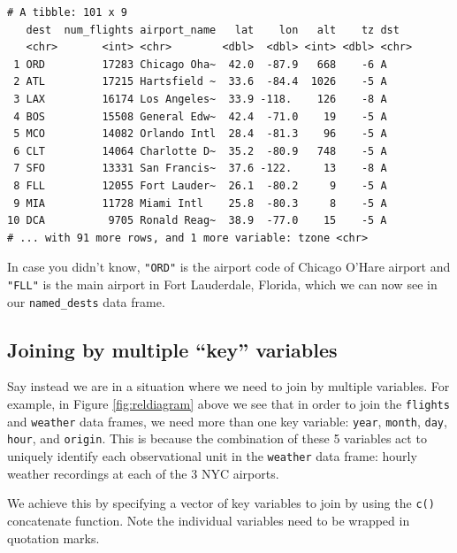 \documentclass[12pt,]{krantz}
\makeatletter
\newenvironment{Shaded}{\begin{snugshade}}{\end{snugshade}}
\newcommand{\KeywordTok}[1]{\textcolor[rgb]{0.27,0.27,0.27}{\textbf{#1}}}
\newcommand{\DataTypeTok}[1]{\textcolor[rgb]{0.27,0.27,0.27}{#1}}
\newcommand{\StringTok}[1]{\textcolor[rgb]{0.5,0.5,0.5}{#1}}
\newcommand{\OperatorTok}[1]{\textcolor[rgb]{0.43,0.43,0.43}{\textbf{#1}}}
\newcommand{\NormalTok}[1]{#1}
\newenvironment{kframe}{%
\medskip{}
\setlength{\fboxsep}{.8em}
 \def\at@end@of@kframe{}%
 \ifinner\ifhmode%
  \def\at@end@of@kframe{\end{minipage}}%
  \begin{minipage}{\columnwidth}%
 \fi\fi%
 \def\FrameCommand##1{\hskip\@totalleftmargin \hskip-\fboxsep
 \colorbox{shadecolor}{##1}\hskip-\fboxsep
     \hskip-\linewidth \hskip-\@totalleftmargin \hskip\columnwidth}%
 \MakeFramed {\advance\hsize-\width
   \@totalleftmargin\z@ \linewidth\hsize
   \@setminipage}}%
 {\par\unskip\endMakeFramed%
 \at@end@of@kframe}
\renewenvironment{Shaded}{\begin{kframe}}{\end{kframe}}
\makeatother
\begin{document}
\begin{verbatim}
# A tibble: 101 x 9
   dest  num_flights airport_name   lat    lon   alt    tz dst  
   <chr>       <int> <chr>        <dbl>  <dbl> <int> <dbl> <chr>
 1 ORD         17283 Chicago Oha~  42.0  -87.9   668    -6 A    
 2 ATL         17215 Hartsfield ~  33.6  -84.4  1026    -5 A    
 3 LAX         16174 Los Angeles~  33.9 -118.    126    -8 A    
 4 BOS         15508 General Edw~  42.4  -71.0    19    -5 A    
 5 MCO         14082 Orlando Intl  28.4  -81.3    96    -5 A    
 6 CLT         14064 Charlotte D~  35.2  -80.9   748    -5 A    
 7 SFO         13331 San Francis~  37.6 -122.     13    -8 A    
 8 FLL         12055 Fort Lauder~  26.1  -80.2     9    -5 A    
 9 MIA         11728 Miami Intl    25.8  -80.3     8    -5 A    
10 DCA          9705 Ronald Reag~  38.9  -77.0    15    -5 A    
# ... with 91 more rows, and 1 more variable: tzone <chr>
\end{verbatim}

In case you didn't know, \texttt{"ORD"} is the airport code of Chicago
O'Hare airport and \texttt{"FLL"} is the main airport in Fort
Lauderdale, Florida, which we can now see in our \texttt{named\_dests}
data frame.

\subsection{\texorpdfstring{Joining by multiple ``key''
variables}{Joining by multiple key variables}}\label{joining-by-multiple-key-variables}

Say instead we are in a situation where we need to join by multiple
variables. For example, in Figure \ref{fig:reldiagram} above we see that
in order to join the \texttt{flights} and \texttt{weather} data frames,
we need more than one key variable: \texttt{year}, \texttt{month},
\texttt{day}, \texttt{hour}, and \texttt{origin}. This is because the
combination of these 5 variables act to uniquely identify each
observational unit in the \texttt{weather} data frame: hourly weather
recordings at each of the 3 NYC airports.

We achieve this by specifying a vector of key variables to join by using
the \texttt{c()} concatenate function. Note the individual variables
need to be wrapped in quotation marks.

\begin{Shaded}
\end{Shaded}
\end{document}
